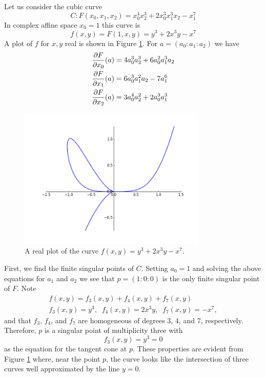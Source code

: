 \begin{example} \label{ex: cubic}
Let us consider the cubic curve
\[
    C: F(x_0,x_1,x_2) =
    x_0^4 x_2^3 + 2 x_0^3 x_1^3 x_2 - x_1^7
\]
In complex affine space $x_0 = 1$ this curve is
\[
    f(x,y) = F(1,x,y) = y^3 + 2 x^3 y - x^7
\]
A plot of $f$ for $x,y$ real is shown in Figure \ref{fig: example-cubic}.
For $a = (a_0 : a_1 : a_2)$ we have
\begin{align} \label{eq: singular-conditions}
    \frac{\partial F}{\partial x_0}(a)
    &=
    4 a_{0}^{3} a_{2}^{3} + 6 a_{0}^{2} a_{1}^{3} a_{2} \notag \\
    \frac{\partial F}{\partial x_1}(a)
    &=
    6 a_{0}^{3} a_{1}^{2} a_{2} - 7 a_{1}^{6} \notag \\
    \frac{\partial F}{\partial x_2}(a)
    &=
    3 a_{0}^{4} a_{2}^{2} + 2 a_{0}^{3} a_{1}^{3}
\end{align}

\begin{figure}
  \label{fig: example-cubic}
  \centering
  \includegraphics[width=0.8\textwidth]{images/2_example_curve.png}
  \caption{A real plot of the curve $f(x,y) = y^3 + 2 x^3 y - x^7$.}
\end{figure}

First, we find the finite singular points of $C$. Setting $a_0=1$ and
solving the above equations for $a_1$ and $a_2$ we see that $p = (1 : 0
: 0)$ is the only finite singular point of $F$. Note
\begin{gather*}
    f(x,y) = f_3(x,y) + f_4(x,y) + f_7(x,y) \\
    f_3(x,y) = y^3, \; \;
    f_4(x,y) = 2 x^3 y, \; \;
    f_7(x,y) = -x^7,
\end{gather*}
and that $f_3$, $f_4$, and $f_7$ are homogeneous of degrees 3, 4, and 7,
respectively. Therefore, $p$ is a singular point of multiplicity three
with
\[
    f_3(x,y) = y^3 = 0
\]
as the equation for the tangent cone at $p$. These properties are
evident from Figure \ref{fig: example-cubic} where, near the point $p$,
the curve looks like the intersection of three curves well approximated
by the line $y = 0$.


\end{example}
